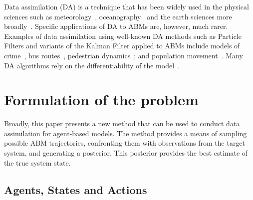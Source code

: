 \documentclass{article}
\begin{document}
Data assimilation (DA) is a technique that has been widely used in the physical sciences such as meteorology~\cite{kalnay_atmospheric_2003}, oceanography~\cite{bertino_sequential_2003} and the earth sciences more broadly~\cite{reichle_data_2008}. Specific applications of DA to ABMs are, however, much rarer. Examples of data assimilation using well-known DA methods such as Particle Filters and variants of the Kalman Filter applied to ABMs include models of crime~\cite{lloyd_exploring_2016}, bus routes~\cite{kieu_dealing_2020}, pedestrian dynamics~\cite{wang_data_2015, ward_dynamic_2016, clay_realtime_2020, malleson_simulating_2020};
and population movement~\cite{lueck_who_2019}. Many DA algorithms rely on the differentiability of the model~\cite{lewis_dynamic_2006}.



\section{Formulation of the problem}

Broadly, this paper presents a new method that can be used to conduct data assimilation for agent-based models. The method provides a means of sampling possible ABM trajectories, confronting them with observations from the target system, and generating a posterior. This posterior provides the best estimate of the true system state. 

\subsection{Agents, States and Actions}
\end{document}
